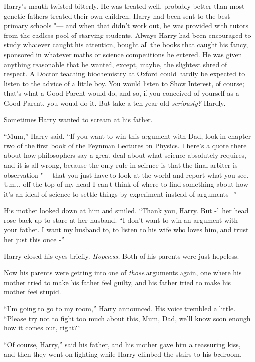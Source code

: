 Harry's mouth twisted bitterly. He was treated well, probably better
than most genetic fathers treated their own children. Harry had been
sent to the best primary schools "--- and when that didn't work out, he was
provided with tutors from the endless pool of starving students. Always
Harry had been encouraged to study whatever caught his attention, bought
all the books that caught his fancy, sponsored in whatever maths or
science competitions he entered. He was given anything reasonable that
he wanted, except, maybe, the slightest shred of respect. A Doctor
teaching biochemistry at Oxford could hardly be expected to listen to
the advice of a little boy. You would listen to Show Interest, of
course; that's what a Good Parent would do, and so, if you conceived of
yourself as a Good Parent, you would do it. But take a ten-year-old
\emph{seriously?} Hardly.

Sometimes Harry wanted to scream at his father.

``Mum,'' Harry said. ``If you want to win this argument with Dad, look
in chapter two of the first book of the Feynman Lectures on Physics.
There's a quote there about how philosophers say a great deal about what
science absolutely requires, and it is all wrong, because the only rule
in science is that the final arbiter is observation "--- that you just have
to look at the world and report what you see. Um... off the top of
my head I can't think of where to find something about how it's an ideal
of science to settle things by experiment instead of arguments -''

His mother looked down at him and smiled. ``Thank you, Harry. But -''
her head rose back up to stare at her husband. ``I don't want to win an
argument with your father. I want my husband to, to listen to his wife
who loves him, and trust her just this once -''

Harry closed his eyes briefly. \emph{Hopeless.} Both of his parents were
just hopeless.

Now his parents were getting into one of \emph{those} arguments again,
one where his mother tried to make his father feel guilty, and his
father tried to make his mother feel stupid.

``I'm going to go to my room,'' Harry announced. His voice trembled a
little. ``Please try not to fight too much about this, Mum, Dad, we'll
know soon enough how it comes out, right?''

``Of course, Harry,'' said his father, and his mother gave him a
reassuring kiss, and then they went on fighting while Harry climbed the
stairs to his bedroom.

